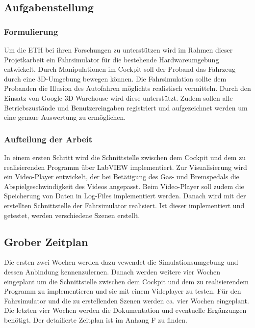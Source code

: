 \subsection{Aufgabenstellung}
\subsubsection{Formulierung}
Um die ETH bei ihren Forschungen zu unterstützen wird im Rahmen dieser Projetkarbeit ein Fahrsimulator für die bestehende Hardwareumgebung entwickelt. Durch Manipulationen im Cockpit soll der Proband das Fahrzeug durch eine 3D-Umgebung bewegen können. Die Fahrsimulation sollte dem Probanden die Illusion des Autofahren möglichts realistisch vermitteln. Durch den Einsatz von Google 3D Warehouse wird diese unterstützt. Zudem sollen alle Betriebszustände und Benutzereingaben registriert und aufgezeichnet werden um eine genaue Auswertung zu ermöglichen. 

\subsubsection{Aufteilung der Arbeit}
In einem ersten Schritt wird die Schnittstelle zwischen dem Cockpit und dem zu realisierenden Programm über LabVIEW implementiert. Zur Visualisierung wird ein Video-Player entwickelt, der bei Betätigung des Gas- und Bremspedals die Abspielgeschwindigkeit des Videos angepasst. Beim Video-Player soll zudem die Speicherung von Daten in Log-Files  implementiert werden. Danach wird mit der erstellten Schnittstelle der Fahrsimulator realisiert. Ist dieser implementiert und getestet, werden verschiedene Szenen erstellt. 

\subsection{Grober Zeitplan}
Die ersten zwei Wochen werden dazu vewendet die Simulationsumgebung und dessen Anbindung kennenzulernen. Danach werden weitere vier Wochen eingeplant um die Schnittstelle zwischen dem Cockpit und dem zu realisierendem Programm zu implementieren und sie mit einem Videplayer zu testen. Für den Fahrsimulator und die zu erstellenden Szenen werden ca. vier Wochen eingeplant. Die letzten vier Wochen werden die Dokumentation und eventuelle Ergänzungen benötigt. Der detailierte Zeitplan ist im Anhang F zu finden.